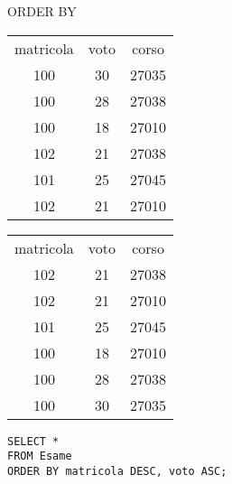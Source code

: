 \begin{frame}{ORDER BY}
\begin{table}[h]
\centering
\begin{minipage}{.45\textwidth}
\centering
\begin{tabular}{|c|c|c|}
\hline
\rowcolor{cyan!30} \multicolumn{3}{|c|}{Esame} \\
\hline
\rowcolor{cyan!30} matricola  & voto & corso \\
\hline
100  & 30 & 27035 \\
100  & 28 & 27038 \\
100  & 18 & 27010 \\
102  & 21 & 27038 \\
101  & 25 & 27045 \\
102 & 21 & 27010 \\
\hline
\end{tabular}
\end{minipage}%
\begin{minipage}{.45\textwidth}
\centering
\begin{tabular}{|c|c|c|}
\hline
\rowcolor{cyan!30} \multicolumn{3}{|c|}{Esame} \\
\hline
\rowcolor{cyan!30} matricola  & voto & corso \\
\hline
102 & 21 & 27038 \\
102 & 21 & 27010 \\
101 & 25 & 27045 \\
100 & 18 & 27010 \\
100 &  28 & 27038 \\
100 & 30 & 27035 \\
\hline
\end{tabular}
\end{minipage}
\end{table}
\vspace{2em}
\texttt{SELECT *\\FROM Esame\\ORDER BY matricola DESC, voto ASC;}
\end{frame}

